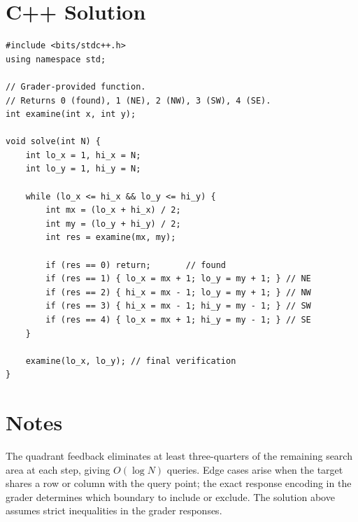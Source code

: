 \documentclass[11pt,a4paper]{article}
\begin{document}
\section{C++ Solution}

\begin{lstlisting}
#include <bits/stdc++.h>
using namespace std;

// Grader-provided function.
// Returns 0 (found), 1 (NE), 2 (NW), 3 (SW), 4 (SE).
int examine(int x, int y);

void solve(int N) {
    int lo_x = 1, hi_x = N;
    int lo_y = 1, hi_y = N;

    while (lo_x <= hi_x && lo_y <= hi_y) {
        int mx = (lo_x + hi_x) / 2;
        int my = (lo_y + hi_y) / 2;
        int res = examine(mx, my);

        if (res == 0) return;       // found
        if (res == 1) { lo_x = mx + 1; lo_y = my + 1; } // NE
        if (res == 2) { hi_x = mx - 1; lo_y = my + 1; } // NW
        if (res == 3) { hi_x = mx - 1; hi_y = my - 1; } // SW
        if (res == 4) { lo_x = mx + 1; hi_y = my - 1; } // SE
    }

    examine(lo_x, lo_y); // final verification
}
\end{lstlisting}

\section{Notes}
The quadrant feedback eliminates at least three-quarters of the remaining search area at each step, giving $O(\log N)$ queries. Edge cases arise when the target shares a row or column with the query point; the exact response encoding in the grader determines which boundary to include or exclude. The solution above assumes strict inequalities in the grader responses.
\end{document}
